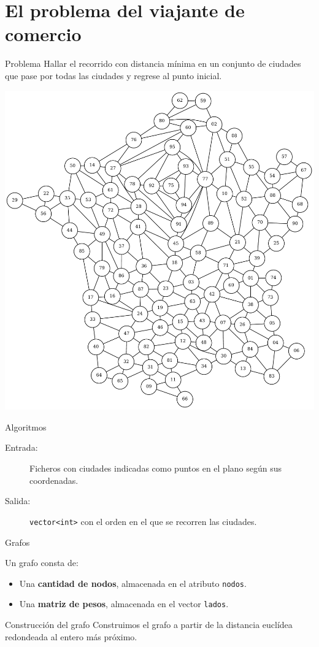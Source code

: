 \section{El problema del viajante de comercio}

\begin{frame}{Problema}
Hallar el recorrido con distancia mínima en un conjunto de
ciudades que pase por todas las ciudades y regrese al punto inicial.

\includegraphics[width=.5\textwidth]{img/Francia} \centering
\end{frame}

\begin{frame}{Algoritmos}
\begin{description}
 \item[Entrada:] Ficheros con ciudades indicadas como puntos en el plano según sus
 coordenadas.
 \item[Salida:] \texttt{vector<int>} con el orden en el que se recorren las ciudades.
\end{description}
\end{frame}

\begin{frame}{Grafos}

Un grafo consta de:

\begin{itemize}
  \item Una \textbf{cantidad de nodos}, almacenada en el atributo \texttt{nodos}.
  \item Una \textbf{matriz de pesos}, almacenada en el vector \texttt{lados}.
\end{itemize}

\end{frame}

\begin{frame}[fragile]{Construcción del grafo}
Construimos el grafo a partir de la distancia euclídea redondeada al entero más próximo.

\end{frame}

